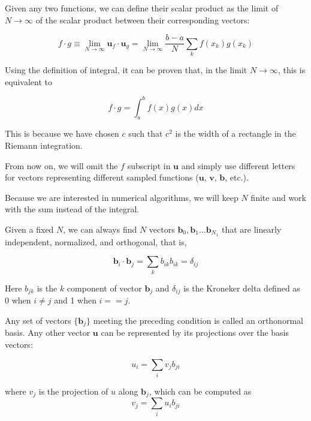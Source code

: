\documentclass[justified,sixbynine]{tufte-book}
\theoremstyle{plain}%
\theoremstyle{definition}
\theoremstyle{remark}
\begin{document}
\begin{fullwidth}
Given any two functions, we can define their scalar product as the limit of $N\rightarrow\infty$ of the scalar product between their corresponding vectors:

\begin{equation}
f \cdot g \equiv \lim_{N\rightarrow\infty} \mathbf{u}_f \cdot \mathbf{u}_g =
\lim_{N\rightarrow\infty} \frac{b-a}{N} \sum_k f(x_k) g(x_k)
\end{equation}

Using the definition of integral, it can be proven that, in the limit $N\rightarrow\infty$, this is equivalent to

\begin{equation}
f \cdot g = \int_a^b f(x) g(x) dx
\end{equation}

This is because we have chosen $c$ such that $c^2$ is the width of a rectangle in the Riemann integration.

From now on, we will omit the $f$ subscript in $\mathbf{u}$ and simply use different letters for vectors representing different sampled functions ($\mathbf{u}$, $\mathbf{v}$, $\mathbf{b}$, etc.).

Because we are interested in numerical algorithms, we will keep $N$ finite and work with the sum instead of the integral.

Given a fixed $N$, we can always find $N$ vectors $\mathbf{b}_0,\mathbf{b}_1...\mathbf{b}_{N_1}$ that are linearly independent, normalized, and orthogonal, that is,

\begin{equation}
\mathbf{b}_i \cdot \mathbf{b}_j = \sum_k b_{ik} b_{ik} = \delta_{ij}
\end{equation}

Here $b_{jk}$ is the $k$ component of vector $\mathbf{b}_j$ and $\delta_{ij}$ is the Kroneker delta defined as 0 when $i\neq j$ and 1 when $i==j$.

Any set of vectors $\{\mathbf{b}_j\}$ meeting the preceding condition is called an orthonormal basis. Any other vector $\mathbf{u}$ can be represented by its projections over the basis vectors:

\begin{equation}
  u_i = \sum_i v_j b_{ji}
\end{equation}

where $v_j$ is the projection of $u$ along $\mathbf{b}_j$, which can be computed as
\begin{equation}
  v_j = \sum_i u_i b_{ji}
\end{equation}


\end{fullwidth}
\end{document}
